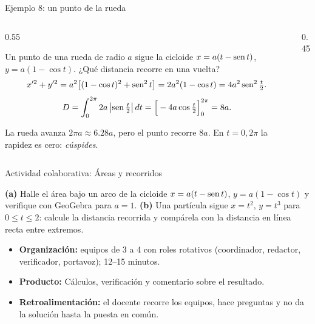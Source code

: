 \documentclass[10pt,aspectratio=169]{beamer}
\begin{document}
\begin{frame}{Ejemplo 8: un punto de la rueda}
  \begin{columns}
    \begin{column}{0.55\textwidth}
      \begin{ejemplo}
        Un punto de una rueda de radio $a$ sigue la cicloide $x=a(t-\operatorname{sen} t)$, $y=a(1-\cos t)$.
        ¿Qué distancia recorre en una vuelta?
        \[ x'^2+y'^2=a^2\big[(1-\cos t)^2+\operatorname{sen}^2t\big]=2a^2(1-\cos t)=4a^2\operatorname{sen}^2\tfrac t2. \]
        \[ D=\int_0^{2\pi}2a\left|\operatorname{sen}\tfrac t2\right|dt=\Big[-4a\cos\tfrac t2\Big]_0^{2\pi}=8a. \]
      \end{ejemplo}
      \small La rueda avanza $2\pi a\approx6.28a$, pero el punto recorre $8a$. En $t=0,2\pi$ la rapidez es cero: \emph{cúspides}.
    \end{column}
    \begin{column}{0.45\textwidth}
      \centering
    \end{column}
  \end{columns}
\end{frame}

\begin{frame}{Actividad colaborativa: Áreas y recorridos}
  \small
  \begin{activa}
    \textbf{(a)} Halle el área bajo un arco de la cicloide $x=a(t-\operatorname{sen} t)$, $y=a(1-\cos t)$ y verifique con GeoGebra para $a=1$. \textbf{(b)} Una partícula sigue $x=t^2$, $y=t^3$ para $0\le t\le2$: calcule la distancia recorrida y compárela con la distancia en línea recta entre extremos.
  \end{activa}
  \begin{itemize}
    \item \textbf{Organización:} equipos de 3 a 4 con roles rotativos (coordinador, redactor, verificador, portavoz); 12--15 minutos.
    \item \textbf{Producto:} Cálculos, verificación y comentario sobre el resultado.
    \item \textbf{Retroalimentación:} el docente recorre los equipos, hace preguntas y no da la solución hasta la puesta en común.
  \end{itemize}
\end{frame}
\end{document}
